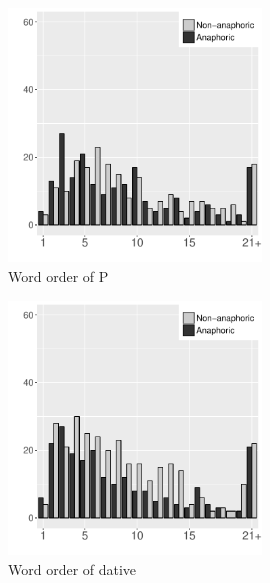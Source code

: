 \begin{figure}
	\begin{center}
	\includegraphics[width=0.6\textwidth]{figure/DEPositionASPP.pdf}
	\caption{Word order of P}
	\label{DEPositionASPPF}
	\end{center}
\end{figure}
\begin{figure}
	\begin{center}
	\includegraphics[width=0.6\textwidth]{figure/DEPositionASPDAT.pdf}
	\caption{Word order of dative}
	\label{DEPositionASPDATF}
	\end{center}
\end{figure}



